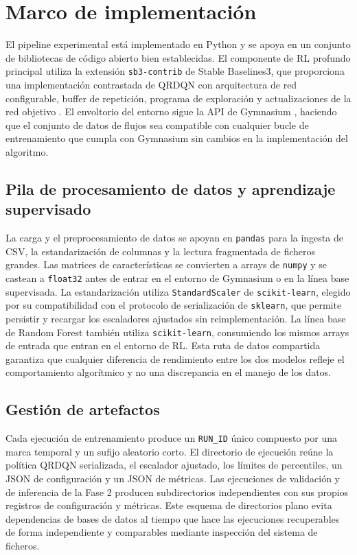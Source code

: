 \section{Marco de implementación}
El pipeline experimental está implementado en Python y se apoya en un conjunto de bibliotecas de código abierto bien establecidas. El componente de RL profundo principal utiliza la extensión \texttt{sb3-contrib} de Stable Baselines3, que proporciona una implementación contrastada de QRDQN con arquitectura de red configurable, buffer de repetición, programa de exploración y actualizaciones de la red objetivo \parencite{SB3ContribQRDQNDocs}. El envoltorio del entorno sigue la API de Gymnasium \parencite{GymnasiumDocs}, haciendo que el conjunto de datos de flujos sea compatible con cualquier bucle de entrenamiento que cumpla con Gymnasium sin cambios en la implementación del algoritmo.

\subsection{Pila de procesamiento de datos y aprendizaje supervisado}
La carga y el preprocesamiento de datos se apoyan en \texttt{pandas} para la ingesta de CSV, la estandarización de columnas y la lectura fragmentada de ficheros grandes. Las matrices de características se convierten a arrays de \texttt{numpy} y se castean a \texttt{float32} antes de entrar en el entorno de Gymnasium o en la línea base supervisada. La estandarización utiliza \texttt{StandardScaler} de \texttt{scikit-learn}, elegido por su compatibilidad con el protocolo de serialización de \texttt{sklearn}, que permite persistir y recargar los escaladores ajustados sin reimplementación. La línea base de Random Forest también utiliza \texttt{scikit-learn}, consumiendo los mismos arrays de entrada que entran en el entorno de RL. Esta ruta de datos compartida garantiza que cualquier diferencia de rendimiento entre los dos modelos refleje el comportamiento algorítmico y no una discrepancia en el manejo de los datos.

\subsection{Gestión de artefactos}
Cada ejecución de entrenamiento produce un \texttt{RUN\_ID} único compuesto por una marca temporal y un sufijo aleatorio corto. El directorio de ejecución reúne la política QRDQN serializada, el escalador ajustado, los límites de percentiles, un JSON de configuración y un JSON de métricas. Las ejecuciones de validación y de inferencia de la Fase 2 producen subdirectorios independientes con sus propios registros de configuración y métricas. Este esquema de directorios plano evita dependencias de bases de datos al tiempo que hace las ejecuciones recuperables de forma independiente y comparables mediante inspección del sistema de ficheros.

